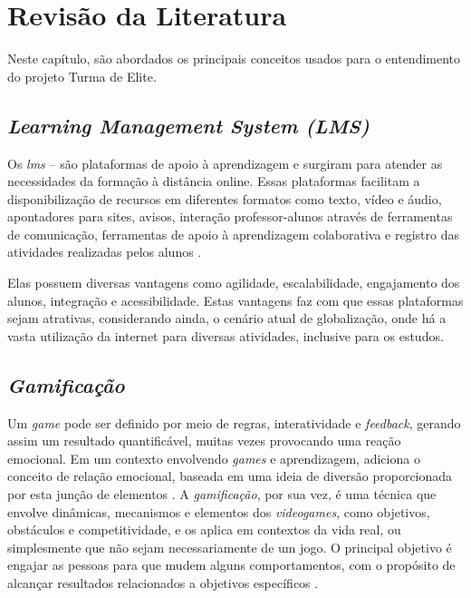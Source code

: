 \chapter{Revisão da Literatura}
Neste capítulo, são abordados os principais conceitos usados para o entendimento do projeto Turma de Elite.

\section{\textit{Learning Management System (LMS)}}
Os \textit{\ac{lms}} – são plataformas de apoio à aprendizagem e surgiram para atender as necessidades da formação à distância online. Essas plataformas facilitam a disponibilização de recursos em diferentes formatos como texto, vídeo e áudio, apontadores para sites, avisos, interação professor-alunos através de ferramentas de comunicação, ferramentas de apoio à aprendizagem colaborativa e registro das atividades realizadas pelos alunos \cite{rentabilizacao-ens-basico-e-secundario:2007}.

Elas possuem diversas vantagens como agilidade, escalabilidade, engajamento dos alunos, integração e acessibilidade. Estas vantagens faz com que essas plataformas sejam atrativas, considerando ainda, o cenário atual de globalização, onde há a vasta utilização da internet para diversas atividades, inclusive para os estudos.



\section{\textit{Gamificação}}
Um \textit{game} pode ser definido por meio de regras, interatividade e \textit{\gls{feedback}}, gerando assim um resultado quantificável, muitas vezes provocando uma reação emocional. Em um contexto envolvendo \textit{games} e aprendizagem, \cite{gamification-of-learning:2012} adiciona o conceito de relação emocional, baseada em uma ideia de diversão proporcionada por esta junção de elementos \cite{gamification-of-learning:2012}.
A \textit{gamificação}, por sua vez, é uma técnica que envolve dinâmicas, mecanismos e elementos dos \textit{videogames}, como objetivos, obstáculos e competitividade, e os aplica em contextos da vida real, ou simplesmente que não sejam necessariamente de um jogo. O principal objetivo é engajar as pessoas para que mudem alguns comportamentos, com o propósito de alcançar resultados relacionados a objetivos específicos \cite{gamificação-na-ead:2014}.


